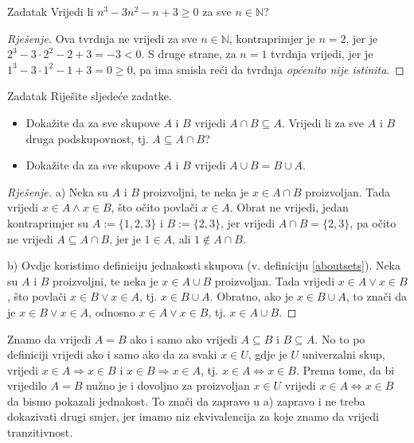 \begin{exercise}{Zadatak} \textbf{}
Vrijedi li $n^3-3n^2-n+3\geq 0$ za sve $n\in \mathbb{N}$?
\end{exercise}
\begin{proof}[Rješenje]
Ova tvrdnja ne vrijedi za sve $n\in \mathbb{N}$, kontraprimjer je $n=2$, jer je $2^3-3\cdot 2^2-2+3=-3<0$. S druge strane, za $n=1$ tvrdnja vrijedi, jer je $1^3-3\cdot 1^2-1+3=0\geq 0$, pa ima smisla reći da tvrdnja \textit{općenito nije istinita}.
\end{proof}
\begin{exercise}{Zadatak} Riješite sljedeće zadatke.
\begin{itemize}
\item[a)] Dokažite da za sve skupove \(A\) i \(B\) vrijedi \(A\cap B\subseteq A\). Vrijedi li za sve \(A\) i \(B\) druga podskupovnost, tj. \(A\subseteq A\cap B\)?
\item[b)] Dokažite da za sve skupove \(A\) i \(B\) vrijedi \(A\cup B=B\cup A\).
\end{itemize}
\begin{proof}[Rješenje]
a) Neka su \(A\) i \(B\) proizvoljni, te neka je \(x\in A\cap B\) proizvoljan. Tada vrijedi \(x\in A\wedge x\in B\), što očito povlači \(x\in A\). Obrat ne vrijedi, jedan kontraprimjer su $A:=\{1, 2, 3\}$ i $B:=\{2, 3\}$, jer vrijedi $A\cap B=\{2, 3\}$, pa očito ne vrijedi $A\subseteq A\cap B$, jer je $1\in A$, ali $1\notin A\cap B$.

b) Ovdje koristimo definiciju jednakosti skupova (v. definiciju \ref{aboutsets}). Neka su \(A\) i \(B\) proizvoljni, te neka je \(x\in A\cup B\) proizvoljan. Tada vrijedi \(x\in A\vee x\in B\), što povlači \(x\in B\vee x\in A\), tj. \(x\in B\cup A\). Obratno, ako je \(x\in B\cup A\), to znači da je \(x\in B\vee x\in A\), odnosno \(x\in A\vee x\in B\), tj. \(x\in A\cup B\).
\end{proof}
\end{exercise}
\begin{remark}
\label{firstrem}
Znamo da vrijedi \(A=B\) ako i samo ako vrijedi \(A\subseteq B\) i \(B\subseteq A\). No to po definiciji vrijedi ako i samo ako da za svaki \(x\in U\), gdje je \(U\) univerzalni skup, vrijedi \(x\in A\Rightarrow x\in B\) i \(x\in B\Rightarrow x\in A\), tj. \(x\in A\Leftrightarrow x\in B\). Prema tome, da bi vrijedilo \(A=B\) nužno je i dovoljno za proizvoljan \(x\in U\) vrijedi \(x\in A\Leftrightarrow x\in B\) da bismo pokazali jednakost. To znači da zapravo u a) zapravo i ne treba dokazivati drugi smjer, jer imamo niz ekvivalencija za koje znamo da vrijedi tranzitivnost.
\end{remark}
